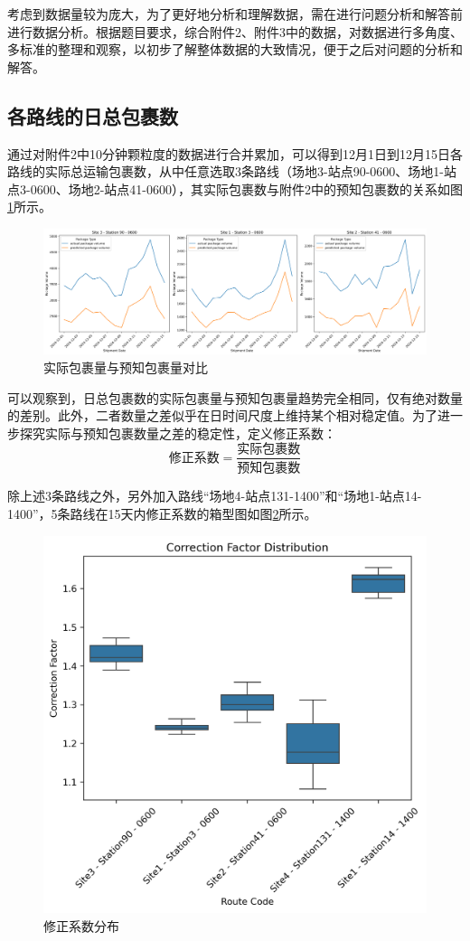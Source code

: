 \documentclass{MMCStyle}
\begin{document}
考虑到数据量较为庞大，为了更好地分析和理解数据，需在进行问题分析和解答前进行数据分析。根据题目要求，综合附件2、附件3中的数据，对数据进行多角度、多标准的整理和观察，以初步了解整体数据的大致情况，便于之后对问题的分析和解答。

\subsection{各路线的日总包裹数}
通过对附件2中10分钟颗粒度的数据进行合并累加，可以得到12月1日到12月15日各路线的实际总运输包裹数，从中任意选取3条路线（场地3-站点90-0600、场地1-站点3-0600、场地2-站点41-0600），其实际包裹数与附件2中的预知包裹数的关系如图\ref{fig:1}所示。

\begin{figure}[htb]
	\centering
	\includegraphics[width=\linewidth]{实际包裹量与预知包裹量对比.png}
	\caption{实际包裹量与预知包裹量对比}
	\label{fig:1}
\end{figure}

可以观察到，日总包裹数的实际包裹量与预知包裹量趋势完全相同，仅有绝对数量的差别。此外，二者数量之差似乎在日时间尺度上维持某个相对稳定值。为了进一步探究实际与预知包裹数量之差的稳定性，定义修正系数：
\begin{equation}
    \text{修正系数} = \frac{\text{实际包裹数}}{\text{预知包裹数}}
\end{equation}

除上述3条路线之外，另外加入路线“场地4-站点131-1400”和“场地1-站点14-1400”，5条路线在15天内修正系数的箱型图如图\ref{fig:2}所示。

\begin{figure}[htb]
	\centering
	\includegraphics[width=0.8\linewidth]{修正系数分布.png}
	\caption{修正系数分布}
	\label{fig:2}
\end{figure}
\end{document}
